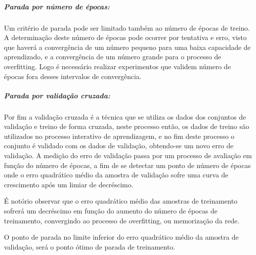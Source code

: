 \documentclass[	12pt, Times, openright, twoside, a4paper, english, brazil]{abntex2}
\begin{document}
            	\subparagraph{Parada por número de épocas:}
            	Um critério de parada pode ser limitado também ao número de épocas de treino. A determinação  deste número de épocas pode ocorrer por tentativa e erro, visto que haverá a convergência de um número pequeno para uma baixa capacidade de aprendizado, e a convergência de um número grande para o processo de overfitting. Logo é necessário realizar experimentos que validem número de épocas fora desses intervalos de convergência.
            	
            	\subparagraph{Parada por validação cruzada:}
            	Por fim a validação cruzada é a técnica que se utiliza os dados dos conjuntos de validação e treino de forma cruzada, neste processo então, os dados de treino são utilizados no processo interativo de aprendizagem, e no fim deste processo o conjunto é validado com os dados de validação, obtendo-se um novo erro de validação.
            	A medição do erro de validação passa por um processo de avaliação em função do número de épocas, a fim de se detectar um ponto de número de épocas onde o erro quadrático médio da amostra de validação sofre uma curva de crescimento após um limiar de decréscimo.
            	
            	É notório observar que o erro quadrático médio das amostras de treinamento sofrerá um decréscimo em função do aumento do número de épocas de treinamento, convergindo ao processo de overfitting, ou memorização da rede.
            	
            	O ponto de parada no limite inferior do erro quadrático médio da amostra de validação, será o ponto ótimo de parada de treinamento.
          	
          	\begin{figure}[H]
          	\end{figure}
        
\end{document}
